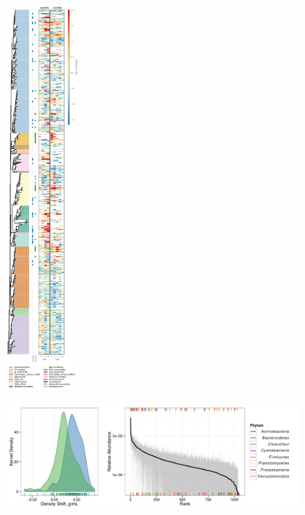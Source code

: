 \begin{figure}[H]
	\begin{center}
	\centerline{\includegraphics[width=0.25\textwidth]{figures/bacteria_tree/bacteria_tree.pdf}}
	\caption{\protect}\label{fig:trees}
        \end{center}
\end{figure}

\begin{figure}[H]
	\begin{center}
	\centerline{\includegraphics[width=\textwidth]{figures/shift_and_rabund2/shift_and_rabund.pdf}}
	\caption{\protect}\label{fig:shift}
        \end{center}
\end{figure}
